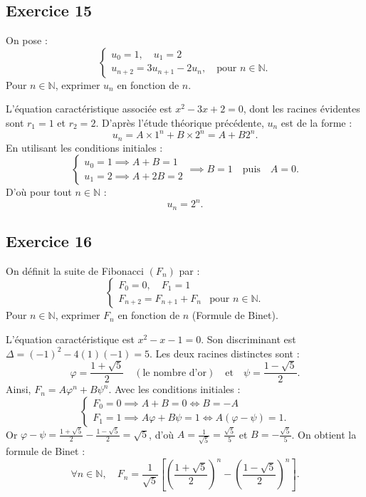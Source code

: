 \documentclass[11pt,a4paper]{article}
\newcommand{\N}{\mathbb{N}}
\begin{document}
\subsection*{Exercice 15}
On pose :
\[
\begin{cases}
u_0 = 1, \quad u_1 = 2\\
u_{n+2} = 3u_{n+1} - 2u_n, \quad \text{pour } n \in \N.
\end{cases}
\]
Pour $n \in \N$, exprimer $u_n$ en fonction de $n$.

\begin{correctionbox}
L'équation caractéristique associée est $x^2 - 3x + 2 = 0$, dont les racines évidentes sont $r_1 = 1$ et $r_2 = 2$.
D'après l'étude théorique précédente, $u_n$ est de la forme :
\[
u_n = A \times 1^n + B \times 2^n = A + B 2^n.
\]
En utilisant les conditions initiales :
\[
\begin{cases}
u_0 = 1 \implies A + B = 1\\
u_1 = 2 \implies A + 2B = 2
\end{cases}
\implies B = 1 \quad \text{puis} \quad A = 0.
\]
D'où pour tout $n \in \N$ :
\[
u_n = 2^n.
\]
\end{correctionbox}

\subsection*{Exercice 16}
On définit la suite de Fibonacci $(F_n)$ par :
\[
\begin{cases}
F_0 = 0, \quad F_1 = 1\\
F_{n+2} = F_{n+1} + F_n & \text{pour } n \in \N.
\end{cases}
\]
Pour $n \in \N$, exprimer $F_n$ en fonction de $n$ (Formule de Binet).

\begin{correctionbox}
L'équation caractéristique est $x^2 - x - 1 = 0$. Son discriminant est $\Delta = (-1)^2 - 4(1)(-1) = 5$.
Les deux racines distinctes sont :
\[
\varphi = \frac{1 + \sqrt{5}}{2} \quad (\text{le nombre d'or}) \quad \text{et} \quad \psi = \frac{1 - \sqrt{5}}{2}.
\]
Ainsi, $F_n = A \varphi^n + B \psi^n$. Avec les conditions initiales :
\[
\begin{cases}
F_0 = 0 \implies A + B = 0 \iff B = -A\\
F_1 = 1 \implies A \varphi + B \psi = 1 \iff A(\varphi - \psi) = 1.
\end{cases}
\]
Or $\varphi - \psi = \frac{1+\sqrt{5}}{2} - \frac{1-\sqrt{5}}{2} = \sqrt{5}$, d'où $A = \frac{1}{\sqrt{5}} = \frac{\sqrt{5}}{5}$ et $B = -\frac{\sqrt{5}}{5}$.
On obtient la formule de Binet :
\[
\forall n \in \N, \quad F_n = \frac{1}{\sqrt{5}}\left[\left(\frac{1+\sqrt{5}}{2}\right)^n - \left(\frac{1-\sqrt{5}}{2}\right)^n\right].
\]
\end{correctionbox}
\end{document}
